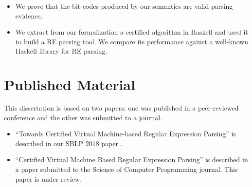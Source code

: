\documentclass[oneside,12pt]{scrbook}
\theoremstyle{definition}
\theoremstyle{plain}
\theoremstyle{definition}
\begin{document}
\begin{itemize}
	\item We prove that the bit-codes produced by our semantics are valid parsing evidence.
	\item We extract from our formalization a certified algorithm in Haskell and used it	to build a RE parsing tool. We compare its performance against a well-known Haskell library for RE parsing. 

\end{itemize}

\section{Published Material}
\label{section:published}
This dissertation is based on two papers: one was published in a peer-reviewed conference and the other was submitted to a journal.

\begin{itemize}
	\item ``Towards Certified Virtual Machine-based Regular Expression Parsing'' is described in our SBLP 2018 paper \cite{DelfinoRibeiro2018}.
	\item ``Certified Virtual Machine Based Regular Expression Parsing'' is described in a paper submitted to the Science of Computer Programming journal. This paper is under review.
\end{itemize}
\end{document}
